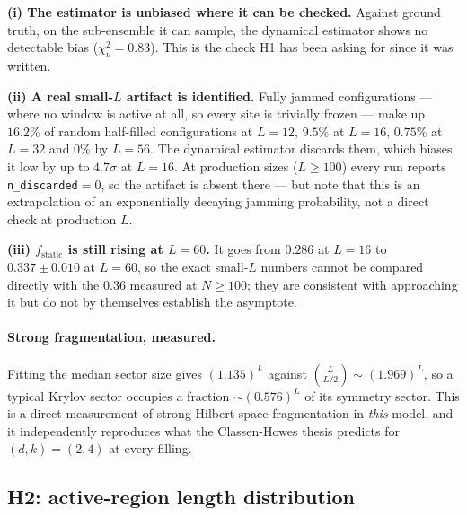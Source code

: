 \documentclass[11pt,a4paper]{article}
\begin{document}
\textbf{(i) The estimator is unbiased where it can be checked.} Against
ground truth, on the sub-ensemble it can sample, the dynamical estimator
shows no detectable bias ($\chi^2_\nu=0.83$). This is the check H1 has been
asking for since it was written.

\textbf{(ii) A real small-$L$ artifact is identified.} Fully jammed
configurations --- where no window is active at all, so every site is
trivially frozen --- make up $16.2\%$ of random half-filled configurations
at $L=12$, $9.5\%$ at $L=16$, $0.75\%$ at $L=32$ and $0\%$ by $L=56$. The
dynamical estimator discards them, which biases it low by up to $4.7\sigma$
at $L=16$. At production sizes ($L\ge100$) every run reports
\texttt{n\_discarded}$=0$, so the artifact is absent there --- but note that
this is an extrapolation of an exponentially decaying jamming probability,
not a direct check at production $L$.

\textbf{(iii) $f_{\text{static}}$ is still rising at $L=60$.} It goes from
$0.286$ at $L=16$ to $0.337\pm0.010$ at $L=60$, so the exact small-$L$
numbers cannot be compared directly with the $0.36$ measured at
$N\ge100$; they are consistent with approaching it but do not by themselves
establish the asymptote.

\paragraph{Strong fragmentation, measured.} Fitting the median sector size
gives $(1.135)^L$ against $\binom{L}{L/2}\sim(1.969)^L$, so a typical
Krylov sector occupies a fraction $\sim(0.576)^L$ of its symmetry sector.
This is a direct measurement of strong Hilbert-space fragmentation in
\emph{this} model, and it independently reproduces what the Classen-Howes
thesis predicts for $(d,k)=(2,4)$ at every filling.

\subsection{H2: active-region length distribution}
\end{document}
